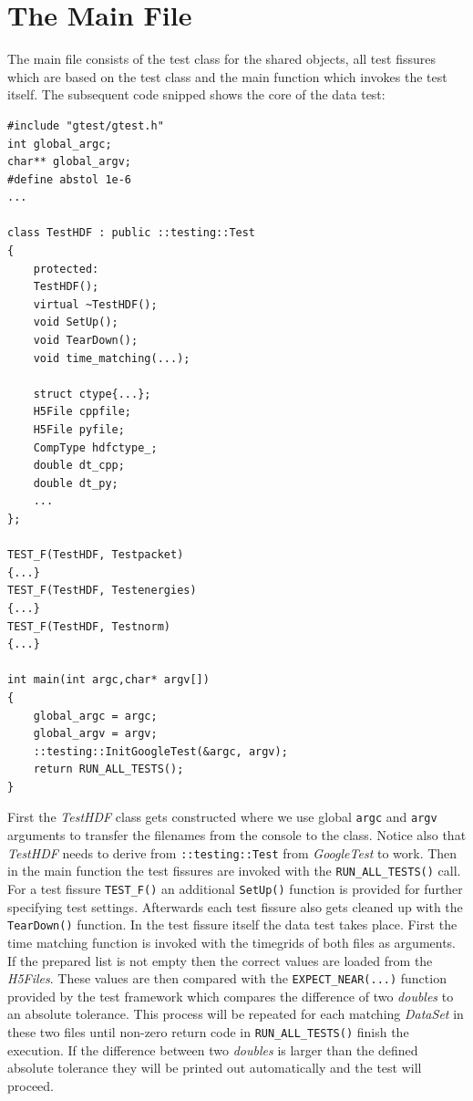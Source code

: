 \section{The Main File}
\label{seq:testmain}
The main file consists of the test class for the shared objects, all test fissures which are based on the test class and the main function which invokes the test itself. The subsequent code snipped shows the core of the data test:

\begin{lstlisting}
#include "gtest/gtest.h"
int global_argc;
char** global_argv;
#define abstol 1e-6
...

class TestHDF : public ::testing::Test
{
	protected:
	TestHDF();
	virtual ~TestHDF();
	void SetUp();
	void TearDown();
	void time_matching(...);
	
	struct ctype{...};
	H5File cppfile;
	H5File pyfile;
	CompType hdfctype_;
	double dt_cpp;
	double dt_py;
	...
};

TEST_F(TestHDF, Testpacket)
{...}
TEST_F(TestHDF, Testenergies)
{...}
TEST_F(TestHDF, Testnorm)
{...}

int main(int argc,char* argv[])
{
	global_argc = argc;
	global_argv = argv;
	::testing::InitGoogleTest(&argc, argv);
	return RUN_ALL_TESTS();
}
\end{lstlisting}
First the \textit{TestHDF} class gets constructed where we use global \texttt{argc} and \texttt{argv} arguments to transfer the filenames from the console to the class. Notice also that \textit{TestHDF} needs to derive from \texttt{::testing::Test} from \textit{GoogleTest} to work. Then in the main function the test fissures are invoked with the \texttt{RUN\_ALL\_TESTS()} call. For a test fissure \texttt{TEST\_F()} an additional \texttt{SetUp()} function is provided for further specifying test settings. Afterwards each test fissure also gets cleaned up with the \texttt{TearDown()} function. In the test fissure itself the data test takes place. First the time matching function is invoked with the timegrids of both files as arguments. If the prepared list is not empty then the correct values are loaded from the \textit{H5Files}. These values are then compared with the \texttt{EXPECT\_NEAR(...)} function provided by the test framework which compares the difference of two \textit{doubles} to an absolute tolerance. This process will be repeated for each matching \textit{DataSet} in these two files until non-zero return code in \texttt{RUN\_ALL\_TESTS()} finish the execution. If the difference between two \textit{doubles} is larger than the defined absolute tolerance they will be printed out automatically and the test will proceed.

